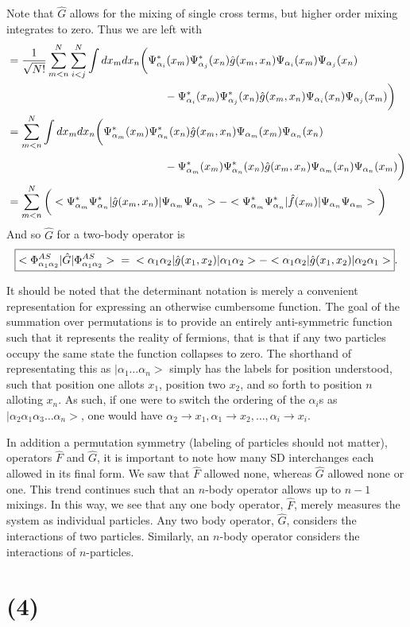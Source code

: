 \documentclass[11 pt, a4paper]{article}
\begin{document}
Note that $\hat{G}$ allows for the mixing of single cross terms, but higher order mixing integrates to zero. Thus we are left with
\begin{align*}
&= \frac{1}{\sqrt{N!}} \sum\limits_{m<n}^N\sum\limits_{i<j}^N \int dx_mdx_n \bigg(\Psi_{\alpha_i}^*(x_m)\Psi_{\alpha_j}^*(x_n)\hat{g}(x_m,x_n)\Psi_{\alpha_i}(x_m)\Psi_{\alpha_j}(x_n) \\
&\hspace{5 cm} -\Psi_{\alpha_i}^*(x_m)\Psi_{\alpha_j}^*(x_n)\hat{g}(x_m,x_n)\Psi_{\alpha_i}(x_n)\Psi_{\alpha_j}(x_m)\bigg) \\
&= \sum\limits_{m<n}^N \int dx_mdx_n \bigg(\Psi_{\alpha_m}^*(x_m)\Psi_{\alpha_n}^*(x_n)\hat{g}(x_m,x_n)\Psi_{\alpha_m}(x_m)\Psi_{\alpha_n}(x_n) \\
& \hspace{5 cm} - \Psi_{\alpha_m}^*(x_m)\Psi_{\alpha_n}^*(x_n)\hat{g}(x_m,x_n)\Psi_{\alpha_m}(x_n)\Psi_{\alpha_n}(x_m)\bigg) \\
&= \sum\limits_{m<n}^N \bigg(<\Psi_{\alpha_m}^*\Psi_{\alpha_n}^*|\hat{g}(x_m,x_n)|\Psi_{\alpha_m}\Psi_{\alpha_n}> - <\Psi_{\alpha_m}^*\Psi_{\alpha_n}^*|\hat{f}(x_m)|\Psi_{\alpha_n}\Psi_{\alpha_m}>\bigg)
\end{align*}
And so $\hat{G}$ for a two-body operator is
\begin{equation*}
\boxed{<\Phi_{\alpha_1\alpha_2}^{AS}|\hat{G}|\Phi_{\alpha_1\alpha_2}^{AS}> \hspace{0.2 cm}=\hspace{0.2 cm} <\alpha_1\alpha_2|\hat{g}(x_1,x_2)|\alpha_1\alpha_2> - <\alpha_1\alpha_2|\hat{g}(x_1,x_2)|\alpha_2\alpha_1>}.
\end{equation*}

It should be noted that the determinant notation is merely a convenient representation for expressing an otherwise cumbersome function. The goal of the summation over permutations is to provide an entirely anti-symmetric function such that it represents the reality of fermions, that is that if any two particles occupy the same state the function collapses to zero. The shorthand of representating this as $|\alpha_1\dots\alpha_n>$ simply has the labels for position understood, such that position one allots $x_1$, position two $x_2$, and so forth to position $n$ alloting $x_n$. As such, if one were to switch the ordering of the $\alpha_i$s as $|\alpha_2\alpha_1\alpha_3\dots\alpha_n>$, one would have $\alpha_2\rightarrow x_1, \alpha_1\rightarrow x_2, \dots, \alpha_i\rightarrow x_i$.

In addition a permutation symmetry (labeling of particles should not matter), operators $\hat{F}$ and $\hat{G}$, it is important to note how many SD interchanges each allowed in its final form. We saw that $\hat{F}$ allowed none, whereas $\hat{G}$ allowed none or one. This trend continues such that an $n$-body operator allows up to $n-1$ mixings. In this way, we see that any one body operator, $\hat{F}$, merely measures the system as individual particles. Any two body operator, $\hat{G}$, considers the interactions of two particles. Similarly, an $n$-body operator considers the interactions of $n$-particles.

\section*{(4)} 
\end{document}
